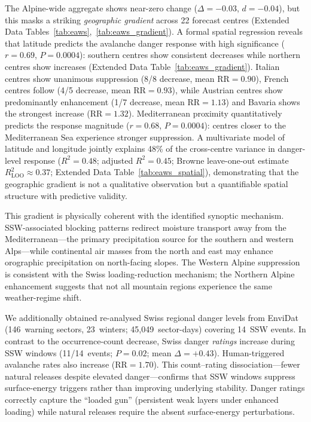 \documentclass[11pt,letterpaper]{article}
\begin{document}
The Alpine-wide aggregate shows near-zero change ($\Delta = -0.03$, $d = -0.04$), but this masks a striking \emph{geographic gradient} across 22 forecast centres (Extended Data Tables~\ref{tab:eaws},~\ref{tab:eaws_gradient}). A formal spatial regression reveals that latitude predicts the avalanche danger response with high significance ($r = 0.69$, $P = 0.0004$): southern centres show consistent decreases while northern centres show increases (Extended Data Table~\ref{tab:eaws_gradient}). Italian centres show unanimous suppression (8/8 decrease, mean $\mathrm{RR} = 0.90$), French centres follow (4/5 decrease, mean $\mathrm{RR} = 0.93$), while Austrian centres show predominantly enhancement (1/7 decrease, mean $\mathrm{RR} = 1.13$) and Bavaria shows the strongest increase ($\mathrm{RR} = 1.32$). Mediterranean proximity quantitatively predicts the response magnitude ($r = 0.68$, $P = 0.0004$): centres closer to the Mediterranean Sea experience stronger suppression. A multivariate model of latitude and longitude jointly explains 48\% of the cross-centre variance in danger-level response ($R^2 = 0.48$; adjusted $R^2 = 0.45$; Browne leave-one-out estimate $R^2_{\mathrm{LOO}} \approx 0.37$; Extended Data Table~\ref{tab:eaws_spatial}), demonstrating that the geographic gradient is not a qualitative observation but a quantifiable spatial structure with predictive validity.

This gradient is physically coherent with the identified synoptic mechanism. SSW-associated blocking patterns redirect moisture transport away from the Mediterranean---the primary precipitation source for the southern and western Alps---while continental air masses from the north and east may enhance orographic precipitation on north-facing slopes\cite{Kolstad2010}. The Western Alpine suppression is consistent with the Swiss loading-reduction mechanism; the Northern Alpine enhancement suggests that not all mountain regions experience the same weather-regime shift.

We additionally obtained re-analysed Swiss regional danger levels from EnviDat (146~warning sectors, 23~winters; 45,049~sector-days) covering 14~SSW events. In contrast to the occurrence-count decrease, Swiss danger \emph{ratings} increase during SSW windows (11/14~events; $P = 0.02$; mean $\Delta = +0.43$). Human-triggered avalanche rates also increase ($\mathrm{RR} = 1.70$). This count--rating dissociation---fewer natural releases despite elevated danger---confirms that SSW windows suppress surface-energy triggers rather than improving underlying stability. Danger ratings correctly capture the ``loaded gun'' (persistent weak layers under enhanced loading) while natural releases require the absent surface-energy perturbations.
\end{document}
